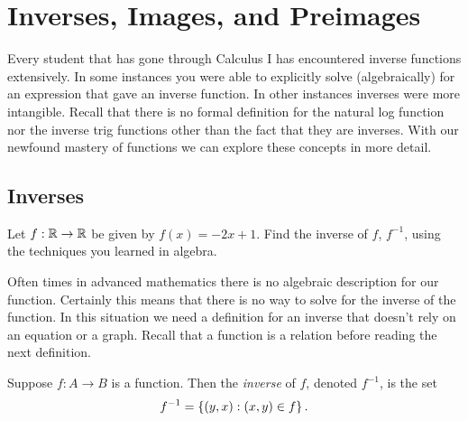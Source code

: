 \chapter{Inverses, Images, and Preimages}


Every student that has gone through Calculus I has encountered inverse functions extensively.  In some instances you were able to explicitly solve (algebraically) for an expression that gave an inverse function.  In other instances inverses were more intangible.  Recall that there is no formal definition for the natural log function nor the inverse trig functions other than the fact that they are inverses.  With our newfound mastery of functions we can explore these concepts in more detail.

\begin{center}
\end{center}

\section{Inverses}

\begin{question}
\item Let $f:\mathbb{R} \to \mathbb{R}$ be given by $f(x) = -2x+1$.  Find the inverse of $f$, $f^{-1}$, using the techniques you learned in algebra.

\vspace{2in}
\end{question}

Often times in advanced mathematics there is no algebraic description for our function.  Certainly this means that there is no way to solve for the inverse of the function.  In this situation we need a definition for an inverse that doesn't rely on an equation or a graph.  Recall that a function is a relation before reading the next definition.

\begin{definition}[Inverse]  Suppose $f: A \to B$ is a function.  Then the \textit{inverse} of $f$, denoted $f^{-1}$, is the set
\[f^{-1} = \left\{(y,x):(x,y)\in f\right\}.\]
\end{definition}

